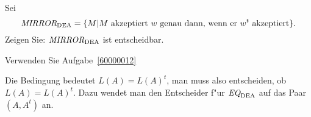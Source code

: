 Sei
\[
\text{\it MIRROR}_{\text{DEA}}
= \{M| \text{$M$ akzeptiert $w$ genau dann, wenn er $w^t$ akzeptiert}\}.
\]
Zeigen Sie: $\text{\it MIRROR}_\text{DEA}$ ist entscheidbar.

\begin{hinweis}
Verwenden Sie Aufgabe~\ref{60000012}
\end{hinweis}

\begin{loesung}
Die Bedingung bedeutet $L(A)=L(A)^t$, man muss also entscheiden,
ob $L(A)=L(A)^t$. Dazu wendet man den Entscheider f"ur
$\text{\it EQ}_{\text{DEA}}$ auf das Paar $(A,A^t)$ an.
\end{loesung}
